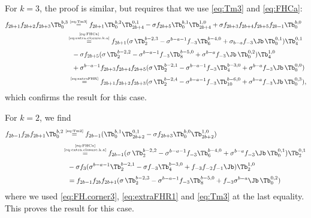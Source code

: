 \documentclass[11pt]{article}
\numberwithin{equation}{section}
\theoremstyle{plain}
\numberwithin{equation}{section}
\begin{document}
For $k=3$, the proof is similar, but requires that we use \eqref{eq:Tm3} and \eqref{eq:FHCa}:
\begin{alignat}{2}
f_{2b+1}f_{2b+2}f_{2b+3} \Tb^{b,3}_0 &\overset{\textrm{\tiny\eqref{eq:Tm3}}}{=} f_{2b+1} \Tb^{b,2}_0 \Tb^{0,1}_{2b+4} - \sigma f_{2b+5}\Tb^{b,1}_0 \Tb^{1,0}_{2b+4} + \sigma f_{2b+3}f_{2b+4}f_{2b+5}f_{2b-1}\Tb^{b,0}_0
\nonumber\\[-0.0cm]
&\hspace{-0.07cm}\overset{\substack{\textrm{\tiny\eqref{eq:FHCa}}\\\textrm{\tiny\eqref{eq:extra.closure.k.a}}\\}}{=} f_{2b+1}(\sigma\, \Tb^{b-2,3}_2 - \sigma^{b-a-1} f_{-3}\Tb^{b-4,0}_{6}+\sigma_{b-a} f_{-3} \Jb\, \Tb^{0,1}_0)\Tb^{0,1}_{4} 
\nonumber\\[0.1cm]
&\hspace{0.20cm}- \sigma f_{2b+5} (\sigma\, \Tb^{b-2,2}_2 - \sigma^{b-a-1}f_{-3}\Tb^{b-5,0}_{8} + \sigma^{b-a}f_{-3} \Jb\, \Tb^{0,2}_0)\Tb^{1,0}_{4} 
\nonumber\\[0.1cm]
&\hspace{0.20cm}+ \sigma^{b-a-1} f_{2b+3}f_{2b+4}f_{2b+5}(\sigma\, \Tb^{b-2,1}_2 - \sigma^{b-a-1}f_{-3}\Tb^{b-3,0}_{4} + \sigma^{b-a}f_{-3}\Jb\, \Tb^{0,0}_0)
\nonumber\\[0.1cm]
&\hspace{0.03cm}\overset{\textrm{\tiny\eqref{eq:extraFHR}}}{=} f_{2b+1}f_{2b+2}f_{2b+3} (\sigma\, \Tb^{b-2,4}_2 - \sigma^{b-a-1}f_{-3}\Tb^{b-6,0}_{10}+\sigma^{b-a}f_{-3}\Jb\,\Tb^{0,3}_0),
\end{alignat}
which confirms the result for this case.

For $k=2$, we find
\begin{alignat}{2}
f_{2b-1}f_{2b}f_{2b+1} \Tb^{b,2}_0 &\overset{\textrm{\tiny\eqref{eq:Tm2}}}{=} f_{2b-1} (\Tb^{b,1}_0 \Tb^{0,1}_{2b+2}-\sigma f_{2b+3}\Tb^{b,0}_0 \Tb^{1,0}_{2b+2})
\nonumber\\[0.1cm]
&\hspace{-0.07cm}\overset{\substack{\textrm{\tiny\eqref{eq:FHCa}}\\\textrm{\tiny\eqref{eq:extra.closure.k.a}}\\}}{=} f_{2b-1} (\sigma\, \Tb^{b-2,2}_2 - \sigma^{b-a-1}f_{-3}\Tb^{b-4,0}_6+\sigma^{b-a}f_{-3}\Jb\,\Tb^{0,1}_0)\Tb^{0,1}_2
\nonumber\\[0.1cm]
&\hspace{0.20cm} - \sigma f_3 (\sigma^{b-a-1} \Tb^{b-2,1}_2 - \sigma f_{-3}\Tb^{b-3,0}_4 + f_{-3}f_{-2}f_{-1}\Jb)\Tb^{1,0}_2 
\nonumber\\[0.1cm]
&\hspace{0.20cm} = f_{2b-1}f_{2b}f_{2b+1}(\sigma\, \Tb^{b-2,3}_2 - \sigma^{b-a-1} f_{-3} \Tb^{b-5,0}_8 + f_{-3}\sigma^{b-a}\Jb\, \Tb^{0,2}_0)
\end{alignat}
where we used \eqref{eq:FH.corner3}, \eqref{eq:extraFHR1} and \eqref{eq:Tm3} at the last equality. This proves the result for this case.
\end{document}
